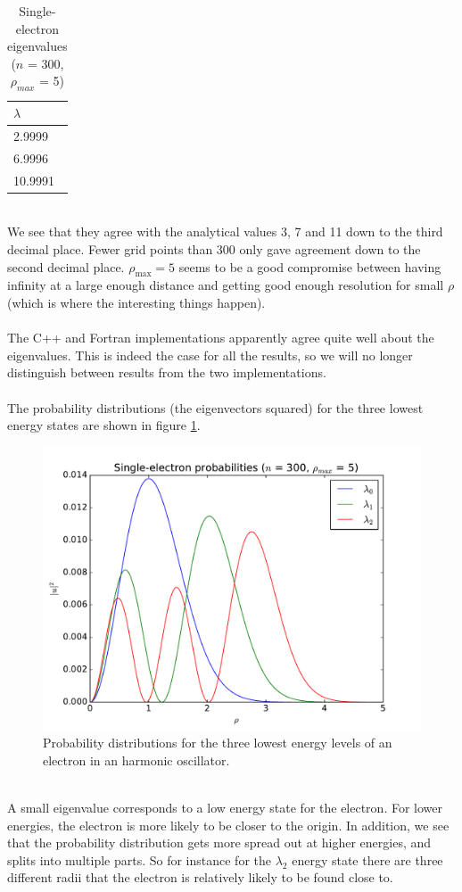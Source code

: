 \documentclass{article}
\begin{document}
\begin{table}[!h]
	\caption{Single-electron eigenvalues ($n$ = 300, $\rho_{max}$ = 5)}
	\centering
	\begin{tabular}{l}
		\toprule
		$\lambda$ \\ [0.5ex]
		\midrule
		2.9999 \\
		6.9996 \\
		10.9991 \\
		\bottomrule
	\end{tabular}
	\label{table:selprob300}
\end{table}\\
We see that they agree with the analytical values 3, 7 and 11 down to the third decimal place. Fewer grid points than 300 only gave agreement down to the second decimal place. $\rho_\text{max} = 5$ seems to be a good compromise between having infinity at a large enough distance and getting good enough resolution for small $\rho$ (which is where the interesting things happen).\\\\
The C++ and Fortran implementations apparently agree quite well about the eigenvalues. This is indeed the case for all the results, so we will no longer distinguish between results from the two implementations. \\\\
The probability distributions (the eigenvectors squared) for the three lowest energy states are shown in figure \ref{fig:selprob300}.\\
\begin{figure}[!h]
	\centering
	\includegraphics[width=\linewidth]{3_single_electron_probabilities_300.pdf}
	\caption{Probability distributions for the three lowest energy levels of an electron in an harmonic oscillator.}
	\label{fig:selprob300}
\end{figure}\\
A small eigenvalue corresponds to a low energy state for the electron. For lower energies, the electron is more likely to be closer to the origin. In addition, we see that the probability distribution gets more spread out at higher energies, and splits into multiple parts. So for instance for the $\lambda_2$ energy state there are three different radii that the electron is relatively likely to be found close to.
\end{document}
